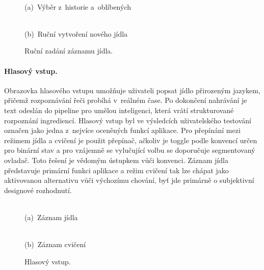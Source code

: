 \begin{figure}[!htb]
	\centering
	\begin{minipage}[t]{0.31\textwidth}
		\centering
		\\(a)~Výběr z~historie a~oblíbených
	\end{minipage}\hspace{3em}
	\begin{minipage}[t]{0.31\textwidth}
		\centering
		\\(b)~Ruční vytvoření nového jídla
	\end{minipage}
	\caption{Ruční zadání záznamu jídla.}
	\label{fig:screenMealLog}
\end{figure}

\paragraph{Hlasový vstup.}
Obrazovka hlasového vstupu umožňuje uživateli popsat jídlo přirozeným jazykem, přičemž rozpoznávání řeči probíhá v~reálném čase.
Po dokončení nahrávání je text odeslán do pipeline pro umělou inteligenci, která vrátí strukturované rozpoznání ingrediencí.
Hlasový vstup byl ve výsledcích uživatelského testování označen jako jedna z~nejvíce oceněných funkcí aplikace.
Pro přepínání mezi režimem jídla a cvičení je použit přepínač, ačkoliv je toggle podle konvencí určen pro binární stav a pro vzájemně se vylučující volbu se doporučuje segmentovaný ovladač.
Toto řešení je vědomým ústupkem vůči konvenci.
Záznam jídla představuje primární funkci aplikace a režim cvičení tak lze chápat jako aktivovanou alternativu vůči výchozímu chování, byť jde primárně o subjektivní designové rozhodnutí.

\begin{figure}[!htb]
	\centering
	\begin{minipage}[t]{0.31\textwidth}
		\centering
		\\(a)~Záznam jídla
	\end{minipage}\hspace{3em}
	\begin{minipage}[t]{0.31\textwidth}
		\centering
		\\(b)~Záznam cvičení
	\end{minipage}
	\caption{Hlasový vstup.}
	\label{fig:screenVoiceLog}
\end{figure}

